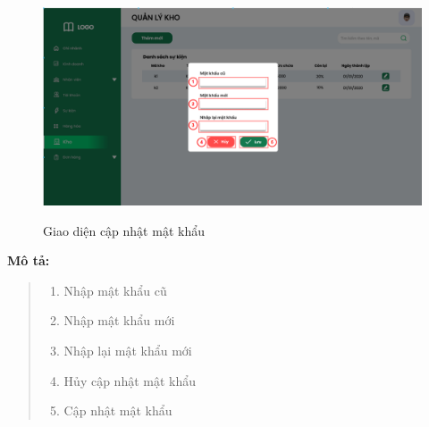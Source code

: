             \begin{figure}[!htp]
                \centering
                \includegraphics[width=12cm]{img/UI/admin/updatePassword.png}
                \label{18}
                \newline
                \caption{Giao diện cập nhật mật khẩu}
            \end{figure}
            
            \textbf{Mô tả:}  
            \begin{quote}
                \begin{enumerate}
                    \item Nhập mật khẩu cũ
                    \item Nhập mật khẩu mới
                    \item Nhập lại mật khẩu mới
                    \item Hủy cập nhật mật khẩu
                    \item Cập nhật mật khẩu
                \end{enumerate}
            \end{quote}
    
